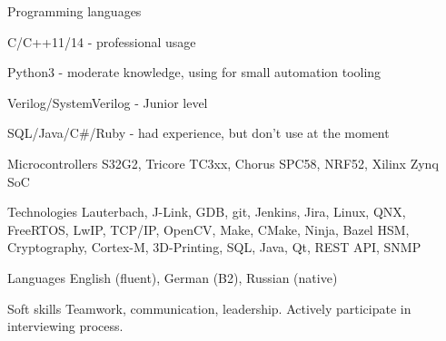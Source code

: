 


\begin{cvskills}


\cvskill
{Programming languages} %
{
\begin{cvitems}
\item{C/C++11/14 - professional usage}
\item{Python3 - moderate knowledge, using for small automation tooling}
\item{Verilog/SystemVerilog - Junior level}
\item{SQL/Java/C\#/Ruby - had experience, but don't use at the moment}
\newline
\end{cvitems}
} %

\newline


\cvskill
{Microcontrollers} %
{S32G2, Tricore TC3xx, Chorus SPC58, NRF52, Xilinx Zynq SoC} %

\newline

\cvskill
{Technologies} %
{Lauterbach, J-Link, GDB, git, Jenkins, Jira, Linux, QNX, FreeRTOS, LwIP, TCP/IP, OpenCV, Make, CMake, Ninja, Bazel
HSM, Cryptography, Cortex-M, 3D-Printing, SQL, Java, Qt, REST API, SNMP} %

\newline

\cvskill
{Languages} %
{ English (fluent), German (B2), Russian (native)} %


\cvskill
{Soft skills} %
{ Teamwork, communication, leadership. Actively participate in interviewing process. } %


\end{cvskills}